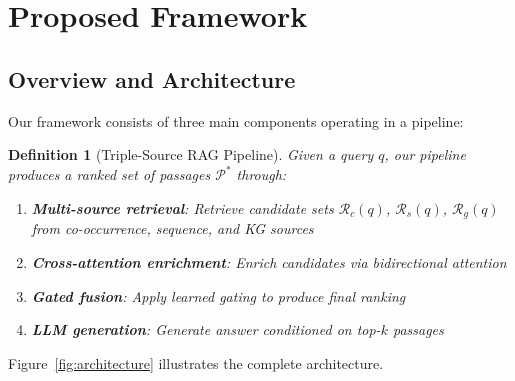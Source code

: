 \documentclass[10pt,twocolumn]{article}
\newtheorem{definition}{Definition}
\begin{document}
\section{Proposed Framework}
\label{sec:framework}

\subsection{Overview and Architecture}
\label{sec:overview}

Our framework consists of three main components operating in a pipeline:

\begin{definition}[Triple-Source RAG Pipeline]
Given a query $q$, our pipeline produces a ranked set of passages $\mathcal{P}^*$ through:
\begin{enumerate}
    \item \textbf{Multi-source retrieval}: Retrieve candidate sets $\mathcal{R}_c(q)$, $\mathcal{R}_s(q)$, $\mathcal{R}_g(q)$ from co-occurrence, sequence, and KG sources
    \item \textbf{Cross-attention enrichment}: Enrich candidates via bidirectional attention
    \item \textbf{Gated fusion}: Apply learned gating to produce final ranking
    \item \textbf{LLM generation}: Generate answer conditioned on top-$k$ passages
\end{enumerate}
\end{definition}

Figure~\ref{fig:architecture} illustrates the complete architecture.
\end{document}
